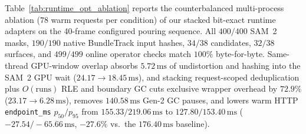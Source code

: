 \documentclass{evidencescene}
\begin{document}
Table~\ref{tab:runtime_opt_ablation} reports the counterbalanced multi-process ablation ($78$ warm requests per condition) of our stacked bit-exact runtime adapters on the 40-frame configured pouring sequence. All $400/400$ SAM~2 masks, $190/190$ native BundleTrack input hashes, $34/38$ candidates, $32/38$ surfaces, and $499/499$ online operator checks match $100\%$ byte-for-byte. Same-thread GPU-window overlap absorbs $5.72\,\mathrm{ms}$ of undistortion and hashing into the SAM~2 GPU wait ($24.17\to 18.45\,\mathrm{ms}$), and stacking request-scoped deduplication plus $O(\text{runs})$ RLE and boundary GC cuts exclusive wrapper overhead by $\mathbf{72.9\%}$ ($23.17\to 6.28\,\mathrm{ms}$), removes $140.58\,\mathrm{ms}$ Gen-2 GC pauses, and lowers warm HTTP \texttt{endpoint\_ms} $p_{50}/p_{95}$ from $155.33/219.06\,\mathrm{ms}$ to $\mathbf{127.80/153.40\,\mathrm{ms}}$ ($\mathbf{-27.54/-65.66\,\mathrm{ms}}$, $-27.6\%$ vs.\ the $176.40\,\mathrm{ms}$ baseline).
\end{document}
